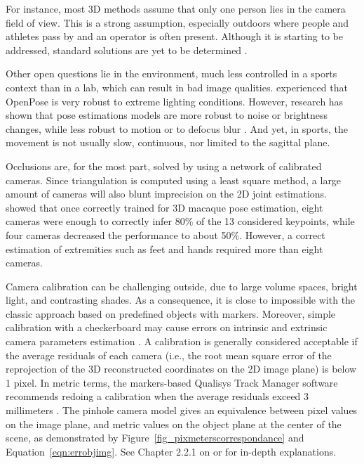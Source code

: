 For instance, most 3D methods assume that only one person lies in the camera field of view. This is a strong assumption, especially outdoors where people and athletes pass by and an operator is often present. Although it is starting to be addressed, standard solutions are yet to be determined \cite{Slembrouck2020,Bridgeman2019, Chu2021, Dong2019}. 

Other open questions lie in the environment, much less controlled in a sports context than in a lab, which can result in bad image qualities. \cite{Viswakumar2019} experienced that OpenPose is very robust to extreme lighting conditions. However, research has shown that pose estimations models are more robust to noise or brightness changes, while less robust to motion or to defocus blur \cite{Wang2021b}. And yet, in sports, the movement is not usually slow, continuous, nor limited to the sagittal plane.

Occlusions are, for the most part, solved by using a network of calibrated cameras. Since triangulation is computed using a least square method, a large amount of cameras will also blunt imprecision on the 2D joint estimations. \cite{Bala2020} showed that once correctly trained for 3D macaque pose estimation, eight cameras were enough to correctly infer 80\% of the 13 considered keypoints, while four cameras decreased the performance to about 50\%. However, a correct estimation of extremities such as feet and hands required more than eight cameras.

Camera calibration can be challenging outside, due to large volume spaces, bright light, and contrasting shades. As a consequence, it is close to impossible with the classic approach based on predefined objects with markers. Moreover, simple calibration with a checkerboard may cause errors on intrinsic and extrinsic camera parameters estimation \cite{Sun2005}. A calibration is generally considered acceptable if the average residuals of each camera (i.e., the root mean square error of the reprojection of the 3D reconstructed coordinates on the 2D image plane) is below 1 pixel. In metric terms, the markers-based Qualisys Track Manager software recommends redoing a calibration when the average residuals exceed 3 millimeters \cite{Qualisys2018}. The pinhole camera model gives an equivalence between pixel values on the image plane, and metric values on the object plane at the center of the scene, as demonstrated by Figure~\ref{fig_pixmeterscorrespondance} and Equation~\ref{eqn:errobjimg}. See Chapter 2.2.1 on  or \cite{Dawson-Howe1994} for in-depth explanations.

